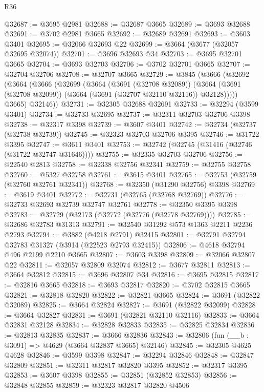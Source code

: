 \begin{lexlean}{R36}
\begin{coremodule}
@32687 := @3695 @2981
@32688 := @32687 @3665
@32689 := @3693 @32688
@32691 := @3702 @2981 @3665
@32692 := @32689 @32691
@32693 := @3603 @3401
@32695 := @32066 @32693 @22
@32699 := @3664 (@3677 (@32057 @32695 @32074))
@32701 := @3696 @32693 @34
@32703 := @3695 @32701 @3665
@32704 := @3693 @32703
@32706 := @3702 @32701 @3665
@32707 := @32704 @32706
@32708 := @32707 @3665
@32729 := @3845
    (@3666
      (@32692
        (@3664
          (@3666
            (@32699
              (@3664
                (@3691 (@32708 @32089))
                (@3664 (@3691 (@32708 @32099)) (@3664 (@3691 (@32707 @32110 @32116)) @32128)))))
          @3665)
        @32146))
@32731 := @32305 @32688 @32691
@32733 := @32294 (@3599 @3401)
@32734 := @32733 @32695
@32737 := @32311 @32703 @32706 @3398
@32738 := @32317 @3398
@32739 := @3607 @3401
@32742 := @32734 (@32737 (@32738 @32739))
@32745 := @32323 @32703 @32706 @3395
@32746 := @31722 @3395
@32747 := @3611 @3401
@32753 := @32742 (@32745 (@31416 (@32746 (@31722 @32747 @31646))))
@32755 := @32335 @32703 @32706
@32756 := @22540 @2813
@32758 := @32338 @32756 @32341
@32759 := @32755 @32758
@32760 := @5327 @32758
@32761 := @3615 @3401
@32765 := @32753 (@32759 (@32760 @32761 @32341))
@32768 := @32350 (@31290 @32756) @3398
@32769 := @3619 @3401
@32772 := @32731 (@32765 (@32768 @32769))
@32776 := @32733 @32693 @32739 @32747 @32761
@32778 := @32350 @3395 @3398
@32783 := @32729 (@32173 (@32772 (@32776 (@32778 @32769))))
@32785 := @32686 @32783 @31313
@32791 := @32540 @31292 @573 @1363 @2211 @2236 @2793
@32794 := @3882 (@4218 @2791) @32415
@32801 := @32791 @32794 @32783 @31327 (@3914 (@22523 @2793 @32415))
@32806 := @4618 @32794 @496 @2199 @2210 @3665
@32807 := @3603 @3398
@32809 := @32066 @32807 @22
@32811 := @32057 @32809 @32074
@32812 := @3677 @32811
@32813 := @3664 @32812
@32815 := @3696 @32807 @34
@32816 := @3695 @32815
@32817 := @32816 @3665
@32818 := @3693 @32817
@32820 := @3702 @32815 @3665
@32821 := @32818 @32820
@32822 := @32821 @3665
@32824 := @3691 (@32822 @32089)
@32825 := @3664 @32824
@32827 := @3691 (@32822 @32099)
@32828 := @3664 @32827
@32831 := @3691 (@32821 @32110 @32116)
@32833 := @3664 @32831 @32128
@32834 := @32828 @32833
@32835 := @32825 @32834
@32836 := @32813 @32835
@32837 := @3666 @32836
@32843 := @32806 (fun (__b : @3091) => @4629 (@3664 @32837 @3665) @32146)
@32845 := @32305 @4625 @4628
@32846 := @3599 @3398
@32847 := @32294 @32846
@32848 := @32847 @32809
@32851 := @32311 @32817 @32820 @3395
@32852 := @32317 @3395
@32853 := @3607 @3398
@32855 := @32851 (@32852 @32853)
@32856 := @32848 @32855
@32859 := @32323 @32817 @32820 @4506

\end{coremodule}
\end{lexlean}
